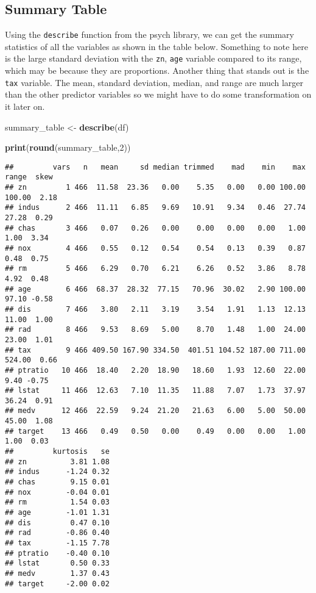\documentclass[
]{article}
\newenvironment{Shaded}{\begin{snugshade}}{\end{snugshade}}
\newcommand{\DecValTok}[1]{\textcolor[rgb]{0.00,0.00,0.81}{#1}}
\newcommand{\FunctionTok}[1]{\textcolor[rgb]{0.13,0.29,0.53}{\textbf{#1}}}
\newcommand{\NormalTok}[1]{#1}
\newcommand{\OtherTok}[1]{\textcolor[rgb]{0.56,0.35,0.01}{#1}}
\begin{document}
\hypertarget{summary-table}{%
\subsection{Summary Table}\label{summary-table}}

Using the \texttt{describe} function from the psych library, we can get
the summary statistics of all the variables as shown in the table below.
Something to note here is the large standard deviation with the
\texttt{zn}, \texttt{age} variable compared to its range, which may be
because they are proportions. Another thing that stands out is the
\texttt{tax} variable. The mean, standard deviation, median, and range
are much larger than the other predictor variables so we might have to
do some transformation on it later on.

\begin{Shaded}
\begin{Highlighting}[]
\NormalTok{summary\_table }\OtherTok{\textless{}{-}} \FunctionTok{describe}\NormalTok{(df)}

\FunctionTok{print}\NormalTok{(}\FunctionTok{round}\NormalTok{(summary\_table,}\DecValTok{2}\NormalTok{))}
\end{Highlighting}
\end{Shaded}

\begin{verbatim}
##         vars   n   mean     sd median trimmed    mad    min    max  range  skew
## zn         1 466  11.58  23.36   0.00    5.35   0.00   0.00 100.00 100.00  2.18
## indus      2 466  11.11   6.85   9.69   10.91   9.34   0.46  27.74  27.28  0.29
## chas       3 466   0.07   0.26   0.00    0.00   0.00   0.00   1.00   1.00  3.34
## nox        4 466   0.55   0.12   0.54    0.54   0.13   0.39   0.87   0.48  0.75
## rm         5 466   6.29   0.70   6.21    6.26   0.52   3.86   8.78   4.92  0.48
## age        6 466  68.37  28.32  77.15   70.96  30.02   2.90 100.00  97.10 -0.58
## dis        7 466   3.80   2.11   3.19    3.54   1.91   1.13  12.13  11.00  1.00
## rad        8 466   9.53   8.69   5.00    8.70   1.48   1.00  24.00  23.00  1.01
## tax        9 466 409.50 167.90 334.50  401.51 104.52 187.00 711.00 524.00  0.66
## ptratio   10 466  18.40   2.20  18.90   18.60   1.93  12.60  22.00   9.40 -0.75
## lstat     11 466  12.63   7.10  11.35   11.88   7.07   1.73  37.97  36.24  0.91
## medv      12 466  22.59   9.24  21.20   21.63   6.00   5.00  50.00  45.00  1.08
## target    13 466   0.49   0.50   0.00    0.49   0.00   0.00   1.00   1.00  0.03
##         kurtosis   se
## zn          3.81 1.08
## indus      -1.24 0.32
## chas        9.15 0.01
## nox        -0.04 0.01
## rm          1.54 0.03
## age        -1.01 1.31
## dis         0.47 0.10
## rad        -0.86 0.40
## tax        -1.15 7.78
## ptratio    -0.40 0.10
## lstat       0.50 0.33
## medv        1.37 0.43
## target     -2.00 0.02
\end{verbatim}
\end{document}
